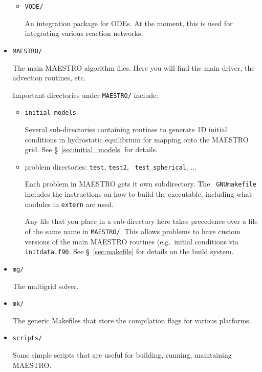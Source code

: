 \begin{itemize}
\begin{itemize}
 \item {\tt VODE/}

 An integration package for ODEs.  At the moment, this is used 
 for integrating various reaction networks.
 
 \end{itemize}

\item {\tt MAESTRO/}

 The main MAESTRO algorithm files.  Here you will find the main driver,
 the advection routines, etc.

 Important directories under {\tt MAESTRO/} include:

 \begin{itemize}

 \item {\tt initial\_models}

   Several sub-directories containing routines to generate
   1D initial conditions in hydrostatic equilibrium for 
   mapping onto the MAESTRO grid.  See \S~\ref{sec:initial_models}
   for details.

 \item problem directories: {\tt test}, {\tt test2}, {\tt
   test\_spherical}, $\ldots$

   Each problem in MAESTRO gets it own subdirectory.  The {\tt
   GNUmakefile} includes the instructions on how to build the
   executable, including what modules in {\tt extern} are used.

   Any file that you place in a sub-directory here takes 
   precedence over a file of the same name in {\tt MAESTRO/}.
   This allows problems to have custom versions of the main
   MAESTRO routines (e.g.\ initial conditions via {\tt initdata.f90}.
   See \S~\ref{sec:makefile} for details on the build system.

 \end{itemize}

\item {\tt mg/}

  The multigrid solver.

\item {\tt mk/}

  The generic Makefiles that store the compilation flags for
  various platforms.

\item {\tt scripts/}

  Some simple scripts that are useful for building, running,
  maintaining MAESTRO.

\end{itemize}


